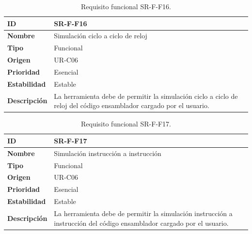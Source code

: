 \begin{center}
\begin{table}[htbp]
\centering
\caption{Requisito funcional SR-F-F16.}
\begin{tabular}{@{}p{2.5cm} p{9cm}@{}} 
\toprule
\textbf{ID} 				& SR-F-F16 \\
\midrule
\textbf{Nombre} 			& Simulación ciclo a ciclo de reloj\\
\midrule
\textbf{Tipo} 			& Funcional \\
\midrule
\textbf{Origen} 			& UR-C06 \\
\midrule
\textbf{Prioridad}		& Esencial \\
\midrule
\textbf{Estabilidad} 		& Estable \\
\midrule
\textbf{Descripción} 	& La herramienta debe de permitir la simulación ciclo a ciclo de reloj del código ensamblador cargado por el usuario. \\
\bottomrule
\end{tabular}
\label{tab:srff16}
\end{table}
\end{center}

\begin{center}
\begin{table}[htbp]
\centering
\caption{Requisito funcional SR-F-F17.}
\begin{tabular}{@{}p{2.5cm} p{9cm}@{}} 
\toprule
\textbf{ID} 				& SR-F-F17 \\
\midrule
\textbf{Nombre} 			& Simulación instrucción a instrucción\\
\midrule
\textbf{Tipo} 			& Funcional \\
\midrule
\textbf{Origen} 			& UR-C06 \\
\midrule
\textbf{Prioridad}		& Esencial \\
\midrule
\textbf{Estabilidad} 		& Estable \\
\midrule
\textbf{Descripción} 	& La herramienta debe de permitir la simulación instrucción a instrucción del código ensamblador cargado por el usuario. \\
\bottomrule
\end{tabular}
\label{tab:srff17}
\end{table}
\end{center}

